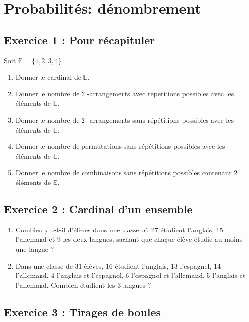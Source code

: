 \chapter{Probabilités: dénombrement}

\section*{Exercice 1 : Pour récapituler}

Soit \(\mathbb{E}=\{1,2,3,4\}\)

\begin{enumerate}
    \item Donner le cardinal de \(\mathbb{E}\).
    \item Donner le nombre de 2 -arrangements avec répétitions possibles avec les éléments de \(\mathbb{E}\).
    \item Donner le nombre de 2 -arrangements sans répétitions possibles avec les éléments de \(\mathbb{E}\).
    \item Donner le nombre de permutations sans répétitions possibles avec les éléments de \(\mathbb{E}\).
    \item Donner le nombre de combinaisons sans répétitions possibles contenant 2 éléments de \(\mathbb{E}\).
\end{enumerate}


\section*{Exercice 2 : Cardinal d'un ensemble}

\begin{enumerate}
    \item Combien y a-t-il d'élèves dans une classe où 27 étudient l'anglais, 15 l'allemand et 9 les deux langues, sachant que chaque élève étudie au moins une langue ?
    \item Dans une classe de 31 élèves, 16 étudient l'anglais, 13 l'espagnol, 14 l'allemand, 4 l'anglais et l'espagnol, 6 l'espagnol et l'allemand, 5 l'anglais et l'allemand. Combien étudient les 3 langues ?
\end{enumerate}


\section*{Exercice 3 : Tirages de boules}

